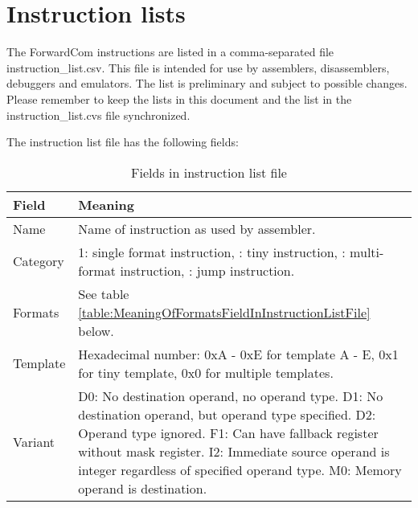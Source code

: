 \documentclass[forwardcom.tex]{subfiles}
\begin{document}
\RaggedRight

\chapter{Instruction lists}\label{chap:InstructionLists}
The ForwardCom instructions are listed in a comma-separated file instruction\_list.csv. This file is intended for use by assemblers, disassemblers, debuggers and emulators. The list is preliminary and subject to possible changes. Please remember to keep the lists in this document and the list in the instruction\_list.cvs file synchronized.
\vspace{2mm}

The instruction list file has the following fields:

\begin{longtable} {|p{18mm}|p{100mm}|}
\caption{Fields in instruction list file} 
\label{table:fieldsInInstructionListFile}
\\
\endfirsthead
\endhead
\hline
\bfseries Field & \bfseries Meaning  \\
\hline
Name & Name of instruction as used by assembler.  \\
\hline
Category & 1: single format instruction, \newline
           2: tiny instruction,  \newline
           3: multi-format instruction,  \newline
           4: jump instruction. \\
\hline
Formats & See table \ref{table:MeaningOfFormatsFieldInInstructionListFile} below.  \\
\hline
Template & Hexadecimal number:  \newline
           0xA - 0xE for template A - E,  \newline
           0x1 for tiny template,  \newline
           0x0 for multiple templates. \\
\hline
Variant & 
D0:  No destination operand, no operand type.\newline
D1:  No destination operand, but operand type specified.\newline
D2:  Operand type ignored.\newline
F1:  Can have fallback register without mask register.\newline
I2:  Immediate source operand is integer regardless of specified operand type.\newline
M0:  Memory operand is destination.\newline

\end{longtable}
\end{document}

